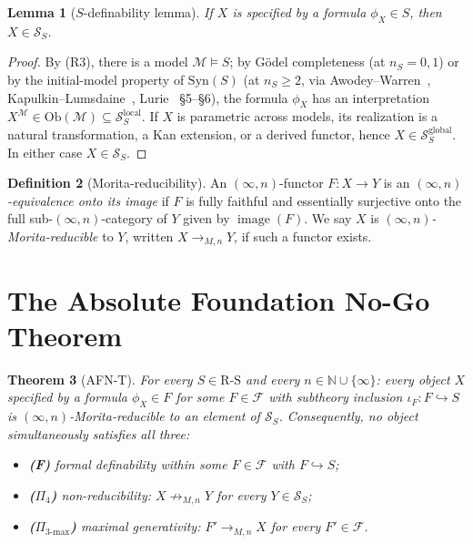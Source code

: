 \documentclass[11pt]{article}
\theoremstyle{plain}
\newtheorem{theorem}{Theorem}[section]
\newtheorem{lemma}[theorem]{Lemma}
\theoremstyle{definition}
\newtheorem{definition}[theorem]{Definition}
\newcommand{\RS}{\mathrm{R\text{-}S}}
\newcommand{\cS}{\mathcal{S}}
\newcommand{\cF}{\mathcal{F}}
\newcommand{\cM}{\mathcal{M}}
\newcommand{\Ob}{\mathrm{Ob}}
\newcommand{\Syn}{\mathrm{Syn}}
\DeclareMathOperator{\image}{image}
\begin{document}
\begin{lemma}[$S$-definability lemma]\label{lem:SS-membership}
If $X$ is specified by a formula $\phi_X \in S$, then $X \in \cS_S$.
\end{lemma}

\begin{proof}
By (R3), there is a model $\cM \models S$; by G\"odel completeness (at $n_S = 0, 1$) or by the initial-model property of $\Syn(S)$ (at $n_S \geq 2$, via Awodey--Warren~\cite{AwodeyWarren2009}, Kapulkin--Lumsdaine~\cite{KapulkinLumsdaine2021}, Lurie~\cite{LurieHTT} \S 5--\S 6), the formula $\phi_X$ has an interpretation $X^\cM \in \Ob(\cM) \subseteq \cS_S^{\mathrm{local}}$. If $X$ is parametric across models, its realization is a natural transformation, a Kan extension, or a derived functor, hence $X \in \cS_S^{\mathrm{global}}$. In either case $X \in \cS_S$.
\end{proof}

\begin{definition}[Morita-reducibility]\label{def:morita}
An $(\infty, n)$-functor $F : X \to Y$ is an \emph{$(\infty, n)$-equivalence onto its image} if $F$ is fully faithful and essentially surjective onto the full sub-$(\infty, n)$-category of $Y$ given by $\image(F)$. We say $X$ is \emph{$(\infty, n)$-Morita-reducible} to $Y$, written $X \to_{M, n} Y$, if such a functor exists.
\end{definition}

\section{The Absolute Foundation No-Go Theorem}\label{sec:afnt}

\begin{theorem}[AFN-T]\label{thm:afnt}
For every $S \in \RS$ and every $n \in \mathbb{N} \cup \{\infty\}$: every object $X$ specified by a formula $\phi_X \in F$ for some $F \in \cF$ with subtheory inclusion $\iota_F : F \hookrightarrow S$ is $(\infty, n)$-Morita-reducible to an element of $\cS_S$. Consequently, no object simultaneously satisfies all three:
\begin{itemize}
\item \textbf{(F)} formal definability within some $F \in \cF$ with $F \hookrightarrow S$;
\item \textbf{($\Pi_4$)} non-reducibility: $X \not\to_{M, n} Y$ for every $Y \in \cS_S$;
\item \textbf{($\Pi_{3\text{-max}}$)} maximal generativity: $F' \to_{M, n} X$ for every $F' \in \cF$.
\end{itemize}
\end{theorem}
\end{document}
